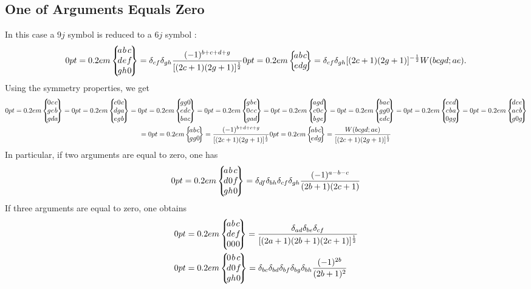 \subsection{One of Arguments Equals Zero}\label{sec:10.9.1}
In this case a $9 j$ symbol is reduced to a $6 j$ symbol \cite{ref110}:
\begin{equation}
\ninej{a}{b}{c}{d}{e}{f}{g}{h}{0} \label{eq:10:9:1}=\delta_{c f} \delta_{g h} \frac{(-1)^{b+c+d+g}}{[(2 c+1)(2 g+1)]^{\frac{1}{2}}}\sixj{a}{b}{c}{e}{d}{g}=\delta_{c f} \delta_{g h}[(2 c+1)(2 g+1)]^{-\frac{1}{2}} W(b c g d ; a e) .
\end{equation}
Using the symmetry properties, we get
\begin{gather}
\ninej{0}{c}{c}{g}{e}{b}{g}{d}{a}=\ninej{c}{0}{c}{d}{g}{a}{e}{g}{b}=\ninej{g}{g}{0}{e}{d}{c}{b}{a}{c}=\ninej{g}{b}{e}{0}{c}{c}{g}{a}{d}=\ninej{a}{g}{d}{c}{0}{c}{b}{g}{e}=\ninej{b}{a}{c}{g}{g}{0}{e}{d}{c}=\ninej{c}{e}{d}{c}{b}{a}{0}{g}{g}=\ninej{d}{c}{e}{a}{c}{b}{g}{0}{g}  \notag\\
=\sixj{a}{b}{c}{g}{g}{0}=\frac{(-1)^{b+d+c+g}}{[(2 c+1)(2 g+1)]^{\frac{1}{2}}}\sixj{a}{b}{c}{e}{d}{g}=\frac{W(b c g d ; a e)}{[(2 c+1)(2 g+1)]^{\frac{1}{2}}}  \label{eq:10:9:2}
\end{gather}
In particular, if two arguments are equal to zero, one has
\begin{equation}
\ninej{a}{b}{c}{d}{0}{f}{g}{h}{0} \label{eq:10:9:3}=\delta_{d f} \delta_{b h} \delta_{c f} \delta_{g h} \frac{(-1)^{a-b-c}}{(2 b+1)(2 c+1)}
\end{equation}
If three arguments are equal to zero, one obtains
\begin{align}
& \ninej{a}{b}{c}{d}{e}{f}{0}{0}{0}=\frac{\delta_{a d} \delta_{b e} \delta_{c f}}{[(2 a+1)(2 b+1)(2 c+1)]^{\frac{1}{2}}}  \label{eq:10:9:4}\\
& \ninej{0}{b}{c}{d}{0}{f}{g}{h}{0}=\delta_{b c} \delta_{b d} \delta_{b f} \delta_{b g} \delta_{b h} \frac{(-1)^{2 b}}{(2 b+1)^{2}} \label{eq:10:9:5}
\end{align}
